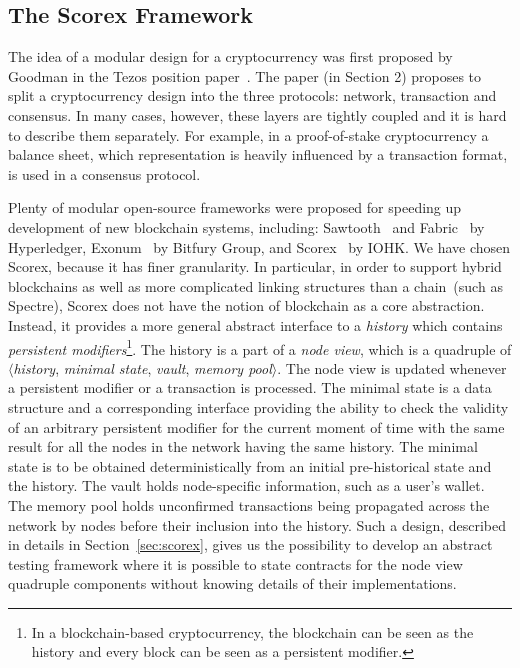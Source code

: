 
\subsection{The Scorex Framework}

The idea of a modular design for a cryptocurrency was first proposed by Goodman in the Tezos position paper~\cite{tezosPosition}. The paper (in Section 2) proposes to split a cryptocurrency design into the three protocols: network, transaction and consensus. In many cases, however, these layers are tightly coupled and it is hard to describe them separately. For example, in a proof-of-stake cryptocurrency a balance sheet, which representation is heavily influenced by a transaction format, is used in a consensus protocol. 

Plenty of modular open-source frameworks were proposed for speeding up development of new blockchain systems, including: Sawtooth~\cite{sawtooth} and Fabric~\cite{fabric} by Hyperledger, Exonum~\cite{exonum} by Bitfury Group, and Scorex~\cite{scorex} by IOHK. We have chosen Scorex, because it has finer granularity. In particular, in order to support hybrid blockchains as well as more complicated linking structures than a chain~(such as Spectre\cite{spectre}), Scorex does not have the notion of blockchain as a core abstraction. Instead, it provides a more general abstract interface to a \textit{history} which contains \textit{persistent modifiers}\footnote{In a blockchain-based cryptocurrency, the blockchain can be seen as the history and every block can be seen as a persistent modifier.}. The history is a part of a \textit{node view}, which is a quadruple of $\langle$\textit{history}, \textit{minimal state}, \textit{vault}, \textit{memory pool}$\rangle$. The node view is updated whenever a persistent modifier or a transaction is processed. The minimal state is a data structure and a corresponding interface providing the ability to check the validity of an arbitrary persistent modifier for the current moment of time with the same result for all the nodes in the network having the same history. The minimal state is to be obtained deterministically from an initial pre-historical state and the history. The vault holds node-specific information, such as a user's wallet. The memory pool holds unconfirmed transactions being propagated across the network by nodes before their inclusion into the history. Such a design, described in details in Section~\ref{sec:scorex}, gives us the possibility to develop an abstract testing framework where it is possible to state contracts for the node view quadruple components without knowing details of their implementations.